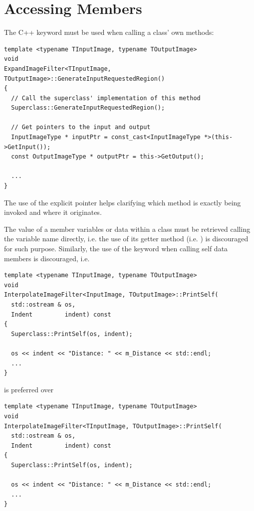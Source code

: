 \section{Accessing Members}%
\label{sec:Accessing Members}

The C++ keyword  must be used when calling a class' own methods:

\small
\begin{verbatim}
template <typename TInputImage, typename TOutputImage>
void
ExpandImageFilter<TInputImage, TOutputImage>::GenerateInputRequestedRegion()
{
  // Call the superclass' implementation of this method
  Superclass::GenerateInputRequestedRegion();

  // Get pointers to the input and output
  InputImageType * inputPtr = const_cast<InputImageType *>(this->GetInput());
  const OutputImageType * outputPtr = this->GetOutput();

  ...
}
\end{verbatim}
\normalsize

The use of the explicit  pointer helps clarifying which method is
exactly being invoked and where it originates.

The value of a member variables or data within a class must be retrieved calling
the variable name directly, i.e. the use of its getter method (i.e.
) is discouraged for such purpose. Similarly, the use of the
 keyword when calling self data members is discouraged, i.e.

\small
\begin{verbatim}
template <typename TInputImage, typename TOutputImage>
void
InterpolateImageFilter<InputImage, TOutputImage>::PrintSelf(
  std::ostream & os,
  Indent         indent) const
{
  Superclass::PrintSelf(os, indent);

  os << indent << "Distance: " << m_Distance << std::endl;
  ...
}
\end{verbatim}
\normalsize

is preferred over

\small
\begin{verbatim}
template <typename TInputImage, typename TOutputImage>
void
InterpolateImageFilter<TInputImage, TOutputImage>::PrintSelf(
  std::ostream & os,
  Indent         indent) const
{
  Superclass::PrintSelf(os, indent);

  os << indent << "Distance: " << m_Distance << std::endl;
  ...
}
\end{verbatim}
\normalsize


